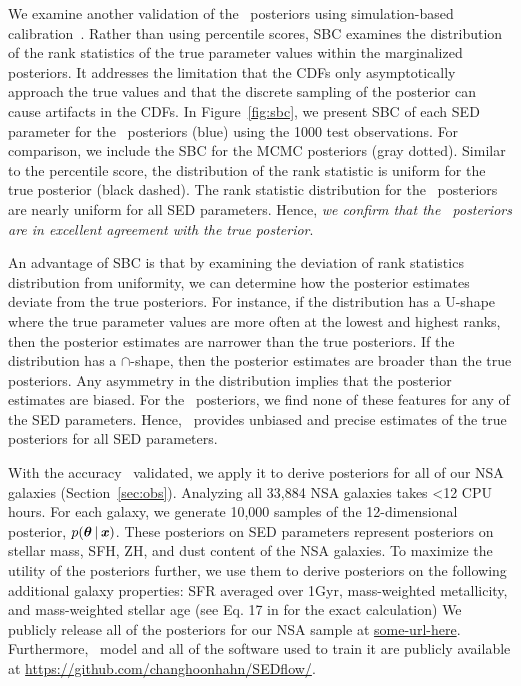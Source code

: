 We examine another validation of the \sedflow~posteriors using simulation-based
calibration~\citep[SBC;][]{talts2020}. 
Rather than using percentile scores, SBC examines the distribution of the rank
statistics of the true parameter values within the marginalized posteriors. 
It addresses the limitation that the CDFs only asymptotically approach the true
values and that the discrete sampling of the posterior can cause artifacts in
the CDFs. 
In Figure~\ref{fig:sbc}, we present SBC of each SED parameter for the
\sedflow~posteriors (blue) using the 1000 test observations.
For comparison, we include the SBC for the MCMC posteriors (gray dotted). 
Similar to the percentile score, the distribution of the rank statistic is
uniform for the true posterior (black dashed). 
The rank statistic distribution for the \sedflow~posteriors are nearly uniform
for all SED parameters. 
Hence, \emph{we confirm that the \sedflow~posteriors are in excellent agreement
with the true posterior}.

An advantage of SBC is that by examining the deviation of rank statistics
distribution from uniformity, we can determine how the posterior estimates
deviate from the true posteriors. 
For instance, if the distribution has a U-shape where the true parameter values
are more often at the lowest and highest ranks, then the posterior estimates
are narrower than the true posteriors.
If the distribution has a $\cap$-shape, then the posterior estimates are
broader than the true posteriors. 
Any asymmetry in the distribution implies that the posterior estimates are
biased.  
For the \sedflow~posteriors, we find none of these features for any of the SED
parameters. 
Hence, \sedflow~provides unbiased and precise estimates of the true posteriors
for all SED parameters. 

With the accuracy \sedflow~validated, we apply it to derive posteriors for all
of our NSA galaxies (Section~\ref{sec:obs}). 
Analyzing all 33,884 NSA galaxies takes <12 CPU hours. 
For each galaxy, we generate 10,000 samples of the 12-dimensional posterior,
$p(\boldsymbol{\theta} \,|\, \textbf{\textit{x}})$. 
These posteriors on SED parameters represent posteriors on stellar mass, SFH,
ZH, and dust content of the NSA galaxies. 
To maximize the utility of the posteriors further, we use them to derive
posteriors on the following additional galaxy properties: SFR averaged over
1Gyr, mass-weighted metallicity, and mass-weighted stellar age (see
Eq. 17 in \citealt{hahn2022} for the exact calculation)
We publicly release all of the posteriors for our NSA sample at 
\url{some-url-here}. 
Furthermore, \sedflow~model and all of the software used to train it are
publicly available at \url{https://github.com/changhoonhahn/SEDflow/}. 
